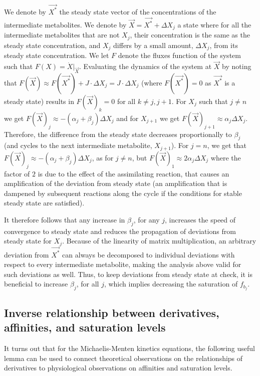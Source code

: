  We denote by $\vec{X^*}$ the steady state vector of the concentrations of the intermediate metabolites.
 We denote by $\vec{X}=\vec{X^*}+\Delta X_j$ a state where for all the intermediate metabolites that are not $X_j$, their concentration is the same as the steady state concentration, and $X_j$ differs by a small amount, $\Delta X_j$, from its steady state concentration.
 We let $F$ denote the fluxes function of the system such that $F(X)=\dot{X}\vert_{\vec{X}}$.
 Evaluating the dynamics of the system at $\vec{X}$ by noting that $F(\vec{X})\approx F(\vec{X^*})+J\cdot\Delta X_j=J\cdot\Delta X_j$ (where $F(\vec{X^*})=0$ as $\vec{X^*}$ is a steady state) results in $F(\vec{X})_k=0$ for all $k\neq j,j+1$.
 For $X_j$ such that $j\neq n$ we get $F(\vec{X})_j\approx -(\alpha_j+\beta_j)\Delta X_j$ and for $X_{j+1}$ we get $F(\vec{X})_{j+1}\approx \alpha_{j}\Delta X_j$.
 Therefore, the difference from the steady state decreases proportionally to $\beta_j$ (and cycles to the next intermediate metabolite, $X_{j+1}$).
 For $j=n$, we get that $F(\vec{X})_j\approx -(\alpha_j+\beta_j)\Delta X_j$, as for $j\neq n$, but $F(\vec{X})_{1}\approx 2\alpha_{j}\Delta X_j$ where the factor of $2$ is due to the effect of the assimilating reaction, that causes an amplification of the deviation from steady state (an amplification that is dampened by subsequent reactions along the cycle if the conditions for stable steady state are satisfied).

 It therefore follows that any increase in $\beta_j$, for any $j$, increases the speed of convergence to steady state and reduces the propagation of deviations from steady state for $X_j$.
 Because of the linearity of matrix multiplication, an arbitrary deviation from $\vec{X^*}$ can always be decomposed to individual deviations with respect to every intermediate metabolite, making the analysis above valid for such deviations as well.
 Thus, to keep deviations from steady state at check, it is beneficial to increase $\beta_j$, for all $j$, which implies decreasing the saturation of $f_{b_j}$.


  \label{sec:complexmultibranchconvergence}
    \subsection{Inverse relationship between derivatives, affinities, and saturation levels}
    It turns out that for the Michaelis-Menten kinetics equations, the following useful lemma can be used to connect theoretical observations on the relationships of derivatives to physiological observations on affinities and saturation levels.

